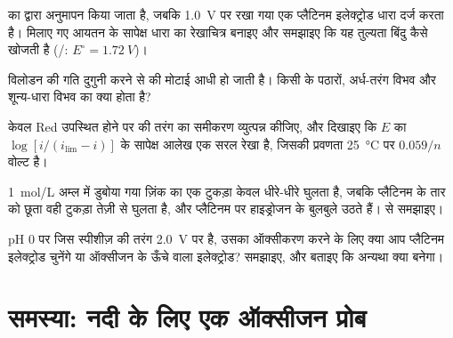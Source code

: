 \begin{exercise}[$\star\star$]\label{exo:b2:current-potential-curves:8}
 का  द्वारा अनुमापन किया जाता है, जबकि
\qty{1.0}{V} पर रखा गया एक प्लैटिनम इलेक्ट्रोड धारा दर्ज करता है। मिलाए गए आयतन के
सापेक्ष धारा का रेखाचित्र बनाइए और समझाइए कि यह तुल्यता बिंदु कैसे खोजती है (/: $E^\circ =
\qty{1.72}{V}$)।
\end{exercise}

\begin{exercise}[$\star\star$]\label{exo:b2:current-potential-curves:9}
विलोडन की गति दुगुनी करने से  की मोटाई आधी हो जाती है।
किसी  के पठारों, अर्ध-तरंग विभव और शून्य-धारा
विभव का क्या होता है?
\end{exercise}

\begin{exercise}[$\star\star\star$]\label{exo:b2:current-potential-curves:10}
केवल Red उपस्थित होने पर  की तरंग का समीकरण व्युत्पन्न कीजिए, और
दिखाइए कि $E$ का $\log[i/(i_{\lim} - i)]$ के सापेक्ष आलेख एक सरल रेखा है, जिसकी
प्रवणता \qty{25}{\degreeCelsius} पर $0.059/n$ वोल्ट है।
\end{exercise}

\begin{exercise}[$\star\star\star$]\label{exo:b2:current-potential-curves:11}
\qty{1}{mol/L} अम्ल में डुबोया गया ज़िंक का एक टुकड़ा केवल धीरे-धीरे घुलता है, जबकि
प्लैटिनम के तार को छूता वही टुकड़ा तेज़ी से घुलता है, और प्लैटिनम पर
हाइड्रोजन के बुलबुले उठते हैं।  से समझाइए।
\end{exercise}

\begin{exercise}[$\star\star\star$]\label{exo:b2:current-potential-curves:12}
pH 0 पर जिस स्पीशीज़ की तरंग \qty{2.0}{V} पर है, उसका ऑक्सीकरण करने के लिए क्या आप
प्लैटिनम इलेक्ट्रोड चुनेंगे या ऑक्सीजन के ऊँचे  वाला इलेक्ट्रोड? समझाइए, और बताइए
कि अन्यथा क्या बनेगा।
\end{exercise}

\section{समस्या: नदी के लिए एक ऑक्सीजन प्रोब}

